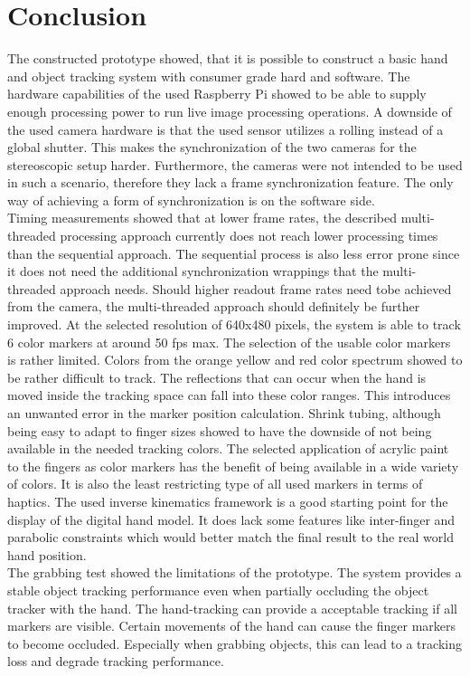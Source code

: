 \chapter{Conclusion}
The constructed prototype showed, that it is possible to construct a basic hand and object tracking system with consumer grade hard and software. The hardware capabilities of the used Raspberry Pi showed to be able to supply enough processing power to run live image processing operations. A downside of the used camera hardware is that the used sensor utilizes a rolling instead of a global shutter. This makes the synchronization of the two cameras for the stereoscopic setup harder. Furthermore, the cameras were not intended to be used in such a scenario, therefore they lack a frame synchronization feature. The only way of achieving a form of synchronization is on the software side.\\
Timing measurements showed that at lower frame rates, the described multi-threaded processing approach currently does not reach lower processing times than the sequential approach. The sequential process is also less error prone since it does not need the additional synchronization wrappings that the multi-threaded approach needs. Should higher readout frame rates  need tobe achieved from the camera, the multi-threaded approach should definitely be further improved. At the selected resolution of 640x480 pixels, the system is able to track 6 color markers at around 50 fps max.
The selection of the usable color markers is rather limited. Colors from the orange yellow and red color spectrum showed to be rather difficult to track. The reflections that can occur when the hand is moved inside the tracking space can fall into these color ranges. This introduces an unwanted error in the marker position calculation.
Shrink tubing, although being easy to adapt to finger sizes showed to have the downside of not being available in the needed tracking colors. The selected application of acrylic paint to the fingers as color markers has the benefit of being available in a wide variety of colors. It is also the least restricting type of all used markers in terms of haptics.
The used inverse kinematics framework is a good starting point for the display of the digital hand model. It does lack some features like inter-finger and parabolic constraints which would better match the final result to the real world hand position.\\
The grabbing test showed the limitations of the prototype. The system provides a stable object tracking performance even when partially occluding the object tracker with the hand. The hand-tracking can provide a acceptable tracking if all markers are visible. Certain movements of the hand can cause the finger markers to become occluded. Especially when grabbing objects, this can lead to a tracking loss and degrade tracking performance.

